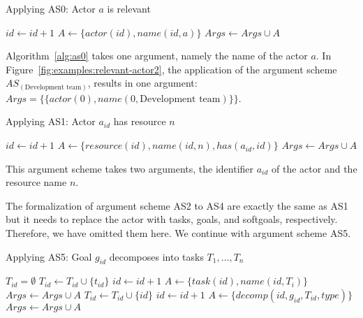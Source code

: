 \begin{algorithm}[h]
  \caption{Applying AS0: Actor $a$ is relevant}\label{alg:as0}
  \begin{algorithmic}[1]
    \State $id\gets id+1$
    \State $A \gets \{actor(id), name(id,a)\}$
    \State $Args \gets Args \cup A$
    \EndProcedure
  \end{algorithmic}
\end{algorithm}

\rationale{} Algorithm~\ref{alg:as0} takes one argument, namely the name of the actor $a$. In Figure~\ref{fig:examples:relevant-actor2}, the application of the argument scheme $AS_(\text{Development team})$, results in one argument: $Args = \{\{actor(0), name(0, \text{Development team})\}\}$.

\begin{algorithm}[h]
  \caption{Applying AS1: Actor $a_{id}$ has resource $n$}\label{alg:as1}
  \begin{algorithmic}[1]
    \State $id\gets id+1$
    \State $A\gets \{resource(id), name(id,n), has(a_{id},id)\}$
    \State $Args \gets Args\cup A$
    \EndProcedure
  \end{algorithmic}
\end{algorithm}

\rationale{}  This argument scheme takes two arguments, the identifier $a_{id}$ of the actor and the resource name $n$. 

The formalization of argument scheme AS2 to AS4 are exactly the same as AS1 but it needs to replace the actor with tasks, goals, and softgoals, respectively. Therefore, we have omitted them here. We continue with argument scheme AS5.

\begin{algorithm}[h]
  \caption{Applying AS5: Goal $g_{id}$ decomposes into tasks $T_1,\ldots,T_n$}\label{alg:as5}
  \begin{algorithmic}[1]
    \State $T_{id} = \emptyset$
        \State $T_{id} \gets T_{id} \cup \{t_{id}\}$
      \Else
        \State $id\gets id+1$
        \State $A \gets \{task(id),name(id,T_i)\}$
        \State $Args \gets Args\cup A$
        \State $T_{id} \gets T_{id} \cup \{id\}$
      \EndIf
    \EndFor
    \State $id\gets id+1$
    \State $A\gets \{decomp(id, g_{id}, T_{id}, type)\}$
    \State $Args \gets Args\cup A$
    \EndProcedure
  \end{algorithmic}
\end{algorithm}

